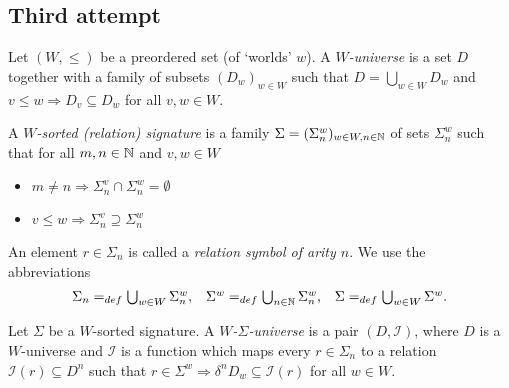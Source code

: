 \documentclass[12pt,a4paper]{report}
\begin{document}

\pagebreak
\subsection{Third attempt}

\newcommand{\CExp}{\nstyle{CExp}}
\newcommand{\CVal}{\nstyle{CVal}}
\newcommand{\loc}{\nstyle{loc}}
\newcommand{\sto}{\nstyle{sto}}
\newcommand{\val}{\nstyle{val}}
\newcommand{\DEF}{\nstyle{DEF}}
\newcommand{\OUT}{\nstyle{OUT}}
\newcommand{\I}{\mathcal{I}}

\begin{definition}
  Let $(W,\le)$ be a preordered set (of `worlds' $w$).
  A {\em $W$-universe} is a set $D$ together with a family of subsets $(D_w)_{w\in W}$ such that
  $D = \bigcup_{w\in W} D_w$ and $v \le w \Rightarrow D_v \subseteq D_w$ for all $v,w \in W$.
\end{definition}

\begin{definition}
  A {\em $W$-sorted (relation) signature} is a family $\Sigma=(\Sigma^w_n)_{w\in W,n\in \mathbb N}$
  of sets $\Sigma^w_n$ such that for all $m,n\in \mathbb N$ and $v,w\in W$
  \begin{itemize}
    \item $m \ne n \Rightarrow \Sigma^v_n \cap \Sigma^w_n = \emptyset$
    \item $v \le w \Rightarrow \Sigma^v_n \supseteq \Sigma^w_n$
  \end{itemize}
\end{definition}

An element $r \in \Sigma_n$ is called a {\em relation symbol of arity $n$}. We use the abbreviations
\[\begin{array}{rcl}
  \Sigma_n =_{def} \bigcup_{w\in W} \Sigma^w_n, &
  \Sigma^w =_{def} \bigcup_{n\in \mathbb N} \Sigma^w_n, &
  \Sigma =_{def} \bigcup_{w\in W} \Sigma^w.
\end{array}\]

\begin{definition}
  Let $\Sigma$ be a $W$-sorted signature. A {\em $W$-$\Sigma$-universe} is a pair
  $(D,\I)$, where $D$ is a $W$-universe and $\I$ is a function which maps every
  $r \in \Sigma_n$ to a relation $\I(r) \subseteq D^n$ such that
  $r \in \Sigma^w \Rightarrow \delta^n D_w \subseteq \I(r)$ for all $w \in W$.
\end{definition}
\end{document}
